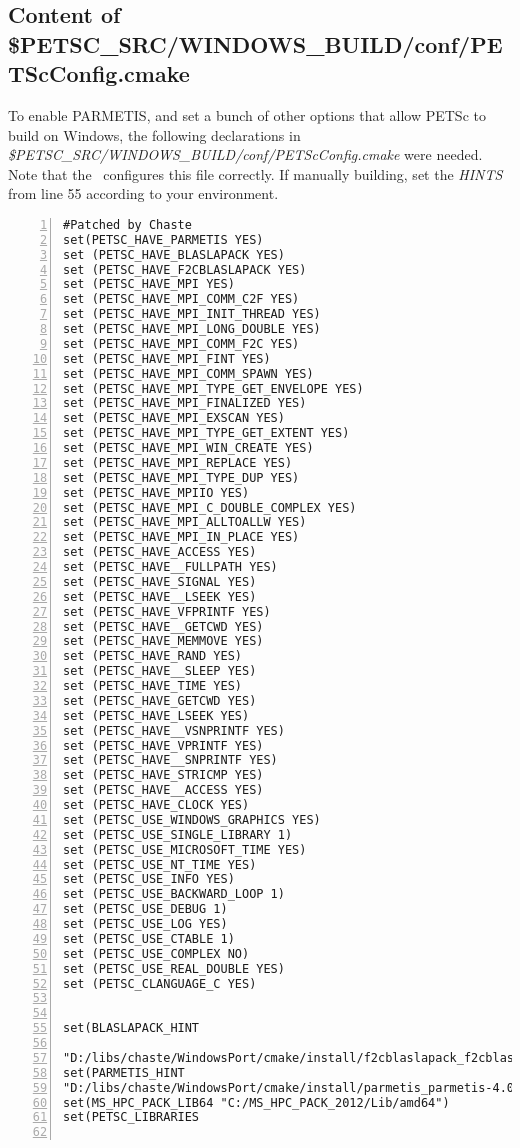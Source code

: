 \documentclass[10pt,a4paper]{article}
\begin{document}
    
\subsection{Content of
\$PETSC\_SRC/WINDOWS\_BUILD/conf/PETScConfig.cmake}\label{sec:petsc:conf}
To enable PARMETIS, and set a bunch of other options that allow PETSc to build
on Windows, the following declarations in
\textit{\$PETSC\_SRC/WINDOWS\_BUILD/conf/PETScConfig.cmake} were needed. Note
that the \chastelibbuilder\ configures this file correctly. If manually
building, set the \textit{HINTS} from line 55 according to your environment.

\begin{codeparchment}
\begin{lstlisting}[numbers=left]
#Patched by Chaste
set(PETSC_HAVE_PARMETIS YES)
set (PETSC_HAVE_BLASLAPACK YES)
set (PETSC_HAVE_F2CBLASLAPACK YES)
set (PETSC_HAVE_MPI YES)
set (PETSC_HAVE_MPI_COMM_C2F YES)
set (PETSC_HAVE_MPI_INIT_THREAD YES)
set (PETSC_HAVE_MPI_LONG_DOUBLE YES)
set (PETSC_HAVE_MPI_COMM_F2C YES)
set (PETSC_HAVE_MPI_FINT YES)
set (PETSC_HAVE_MPI_COMM_SPAWN YES)
set (PETSC_HAVE_MPI_TYPE_GET_ENVELOPE YES)
set (PETSC_HAVE_MPI_FINALIZED YES)
set (PETSC_HAVE_MPI_EXSCAN YES)
set (PETSC_HAVE_MPI_TYPE_GET_EXTENT YES)
set (PETSC_HAVE_MPI_WIN_CREATE YES)
set (PETSC_HAVE_MPI_REPLACE YES)
set (PETSC_HAVE_MPI_TYPE_DUP YES)
set (PETSC_HAVE_MPIIO YES)
set (PETSC_HAVE_MPI_C_DOUBLE_COMPLEX YES)
set (PETSC_HAVE_MPI_ALLTOALLW YES)
set (PETSC_HAVE_MPI_IN_PLACE YES)
set (PETSC_HAVE_ACCESS YES)
set (PETSC_HAVE__FULLPATH YES)
set (PETSC_HAVE_SIGNAL YES)
set (PETSC_HAVE__LSEEK YES)
set (PETSC_HAVE_VFPRINTF YES)
set (PETSC_HAVE__GETCWD YES)
set (PETSC_HAVE_MEMMOVE YES)
set (PETSC_HAVE_RAND YES)
set (PETSC_HAVE__SLEEP YES)
set (PETSC_HAVE_TIME YES)
set (PETSC_HAVE_GETCWD YES)
set (PETSC_HAVE_LSEEK YES)
set (PETSC_HAVE__VSNPRINTF YES)
set (PETSC_HAVE_VPRINTF YES)
set (PETSC_HAVE__SNPRINTF YES)
set (PETSC_HAVE_STRICMP YES)
set (PETSC_HAVE__ACCESS YES)
set (PETSC_HAVE_CLOCK YES)
set (PETSC_USE_WINDOWS_GRAPHICS YES)
set (PETSC_USE_SINGLE_LIBRARY 1)
set (PETSC_USE_MICROSOFT_TIME YES)
set (PETSC_USE_NT_TIME YES)
set (PETSC_USE_INFO YES)
set (PETSC_USE_BACKWARD_LOOP 1)
set (PETSC_USE_DEBUG 1)
set (PETSC_USE_LOG YES)
set (PETSC_USE_CTABLE 1)
set (PETSC_USE_COMPLEX NO)
set (PETSC_USE_REAL_DOUBLE YES)
set (PETSC_CLANGUAGE_C YES)


set(BLASLAPACK_HINT

"D:/libs/chaste/WindowsPort/cmake/install/f2cblaslapack_f2cblaslapack-3.1.1.q/lib")
set(PARMETIS_HINT
"D:/libs/chaste/WindowsPort/cmake/install/parmetis_parmetis-4.0.2-p3/lib")
set(MS_HPC_PACK_LIB64 "C:/MS_HPC_PACK_2012/Lib/amd64") 
set(PETSC_LIBRARIES


\end{lstlisting}
\end{codeparchment}
\end{document}
